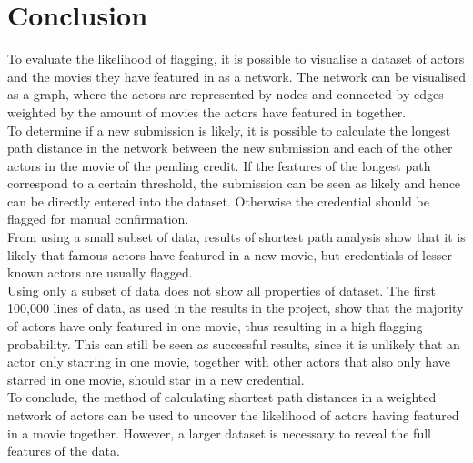 \documentclass[12pt]{ieeeconf}      %
\begin{document}
\section{Conclusion}
\indent To evaluate the likelihood of flagging, it is possible to visualise a dataset of actors and the movies they have featured in as a network. The network can be visualised as a graph, where the actors are represented by nodes and connected by edges weighted by the amount of movies the actors have featured in together.
\\
\indent To determine if a new submission is likely, it is possible to calculate the longest path distance in the network between the new submission and each of the other actors in the movie of the pending credit. If the features of the longest path correspond to a certain threshold, the submission can be seen as likely and hence can be directly entered into the dataset. Otherwise the credential should be flagged for manual confirmation.
\\
\indent From using a small subset of data, results of shortest path analysis show that it is likely that famous actors have featured in a new movie, but credentials of lesser known actors are usually flagged. 
\\
\indent Using only a subset of data does not show all properties of dataset. The first 100,000 lines of data, as used in the results in the project, show that the majority of actors have only featured in one movie, thus resulting in a high flagging probability. This can still be seen as successful results, since it is unlikely that an actor only starring in one movie, together with other actors that also only have starred in one movie, should star in a new credential. 
\\
\indent To conclude, the method of calculating shortest path distances in a weighted network of actors can be used to uncover the likelihood of actors having featured in a movie together. However, a larger dataset is necessary to reveal the full features of the data.


\pagebreak
\onecolumn
\end{document}
